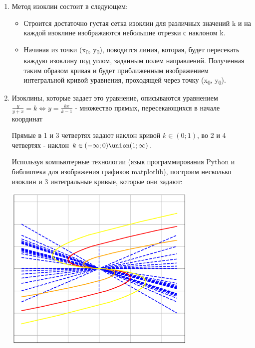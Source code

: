 \begin{enumerate}
    \item Метод изоклин состоит в следующем:

    \begin{itemize}
        \item Строится достаточно густая сетка изоклин для различных значений k и на каждой изоклине изображаются небольшие отрезки с наклоном k.

        \item Начиная из точки (x\textsubscript{0}, y\textsubscript{0}), поводится линия, которая, будет пересекать каждую изоклину под углом, заданным полем направлений.
        Полученная таким образом кривая и будет приближенным изображением интегральной кривой уравнения, проходящей через точку (x\textsubscript{0}, y\textsubscript{0}).
    \end{itemize}

    \item Изоклины, которые задает это уравнение, описываются уравнением $\frac{y}{y + x} = k \Longleftrightarrow y = \frac{kx}{k - 1}$ - множество прямых, пересекающихся в начале координат

    Прямые в 1 и 3 четвертях задают наклон кривой $k \in (0; 1)$, во 2 и 4 четвертях - наклон $k \in (-\infty; 0) \union (1; \infty)$.

    Используя компьютерные технологии (язык программирования Python и библиотека для изображения графиков matplotlib),
    построим несколько изоклин и 3 интегральные кривые, которые они задают:

    \begin{center}
        \includegraphics[height=80mm]{images/2a1}
    \end{center}


\end{enumerate}
